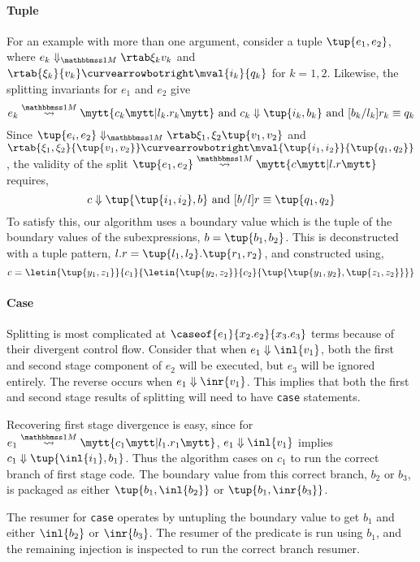 \begin{abstrsyn}
\paragraph{Tuple} 
For an example with more than one argument, consider a tuple $\tup{e_1,e_2}$,
where $\diaone {e_k} {\xi_k} {v_k}$ and $\rtab {\xi_k} {v_k} \vsplito \mval {i_k} {q_k}$
for $k = 1,2$.
Likewise, the splitting invariants for $e_1$ and $e_2$ give
\[
	\splitone {e_k} A {c_k} {l_k.r_k} \text{ and } \reduce {c_k} {\tup{i_k,b_k}} \text{ and } [b_k/l_k]r_k \equiv q_k
\]
Since $\diaone {\tup{e_i,e_2}} {\xi_1,\xi_2} {\tup{v_1,v_2}}$ 
and $\rtab {\xi_1,\xi_2} {\tup{v_1,v_2}} \vsplito \mval {\tup{i_1,i_2}} {\tup{q_1,q_2}}$,
the validity of the split $\splitone {\tup{e_1,e_2}} A {c} {l.r}$ requires,
\[
	\reduce {c} {\tup{\tup{i_1,i_2},b}} \text{ and } [b/l]r \equiv \tup{q_1,q_2}
\]
To satisfy this, our algorithm uses a boundary value which is the tuple of the boundary values of the subexpressions,
$b = \tup{b_1,b_2}$. This is deconstructed with a tuple pattern, $l.r = \tup{l_1,l_2}.\tup{r_1,r_2}$,
and constructed using,
\[
c = \letin{\tup{y_1,z_1}}{c_1}{\letin{\tup{y_2,z_2}}{c_2}{\tup{\tup{y_1, y_2},\tup{z_1, z_2}}}}
\]

\paragraph {Case}
Splitting is most complicated at $\caseof {e_1} {x_2.e_2} {x_3.e_3}$ terms because of their divergent control flow.
Consider that when $\reduce {e_1} {\inl {v_1}}$, both the first and second stage component of $e_2$ will be executed, 
but $e_3$ will be ignored entirely. The reverse occurs when $\reduce {e_1} {\inr {v_1}}$.
This implies that both the first and second stage results of splitting will need to have \texttt{case} statements.

Recovering first stage divergence is easy, since for $\splitone {e_1} ? {c_1} {l_1.r_1}$, 
$\reduce {e_1} {\inl {v_1}}$ implies $\reduce {c_1} {\tup{\inl {i_1},b_1}}$.
Thus the algorithm cases on $c_1$ to run the correct branch of first stage code.
The boundary value from this correct branch, $b_2$ or $b_3$, is packaged as either $\tup {b_1, \inl {b_2}}$ or $\tup {b_1, \inr {b_3}}$.

The resumer for \texttt{case} operates by untupling the boundary value to get $b_1$ and either $\inl {b_2}$ or $\inr {b_3}$.
The resumer of the predicate is run using $b_1$, and the remaining injection is inspected to run the correct branch resumer.


\end{abstrsyn}
